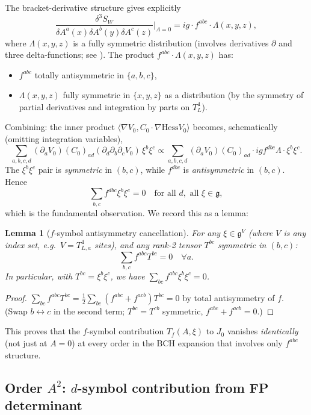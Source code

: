 \documentclass[11pt,a4paper]{amsart}
\newtheorem{lemma}[theorem]{Lemma}
\theoremstyle{definition}
\newcommand{\gfrak}{\mathfrak{g}}
\newcommand{\Hess}{\mathrm{Hess}}
\begin{document}
The bracket-derivative structure gives explicitly
\[
\frac{\delta^3 S_W}{\delta A^a(x) \delta A^b(y) \delta A^c(z)}\Bigr|_{A=0}
= i g \cdot f^{abc} \cdot \Lambda(x, y, z),
\]
where $\Lambda(x, y, z)$ is a fully symmetric distribution (involves
derivatives $\partial$ and three delta-functions; see
\cite[Eq.~(3.6)]{PeskinSchroeder1995}). The product
$f^{abc} \cdot \Lambda(x,y,z)$ has:
\begin{itemize}[leftmargin=2em]
\item $f^{abc}$ totally antisymmetric in $\{a,b,c\}$,
\item $\Lambda(x, y, z)$ fully symmetric in $\{x, y, z\}$ as a distribution
(by the symmetry of partial derivatives and integration by parts on $T^4_L$).
\end{itemize}

Combining: the inner product $\langle \nabla V_0, C_0 \cdot \nabla \Hess V_0\rangle$
becomes, schematically (omitting integration variables),
\[
\sum_{a, b, c, d} (\partial_a V_0) (C_0)_{ad} (\partial_d \partial_b \partial_c V_0) \, \xi^b \xi^c
\propto \sum_{a, b, c, d} (\partial_a V_0) (C_0)_{ad} \cdot i g f^{dbc} \Lambda \cdot \xi^b \xi^c.
\]
The $\xi^b \xi^c$ pair is \emph{symmetric} in $(b,c)$, while $f^{dbc}$
is \emph{antisymmetric} in $(b,c)$. Hence
\[
\sum_{b, c} f^{dbc} \xi^b \xi^c = 0 \quad \text{for all } d, \text{ all } \xi \in \gfrak,
\]
which is the fundamental observation. We record this as a lemma:

\begin{lemma}[$f$-symbol antisymmetry cancellation]\label{lem:fabc-cancel}
For any $\xi \in \gfrak^V$ (where $V$ is any index set, e.g.\ $V = T^4_{L,a}$ sites),
and any rank-2 tensor $T^{bc}$ symmetric in $(b,c)$:
\[
\sum_{b, c} f^{abc} T^{bc} = 0 \quad \forall a.
\]
In particular, with $T^{bc} = \xi^b \xi^c$, we have $\sum_{bc} f^{abc} \xi^b \xi^c = 0$.
\end{lemma}

\begin{proof}
$\sum_{bc} f^{abc} T^{bc} = \frac{1}{2}\sum_{bc}(f^{abc} + f^{acb}) T^{bc} = 0$
by total antisymmetry of $f$. (Swap $b \leftrightarrow c$ in the second term;
$T^{bc} = T^{cb}$ symmetric, $f^{abc} + f^{acb} = 0$.)
\end{proof}

This proves that the $f$-symbol contribution $T_f(A, \xi)$ to $J_0$ vanishes
\emph{identically} (not just at $A = 0$) at every order in the BCH
expansion that involves only $f^{abc}$ structure.

\subsection{Order $A^2$: $d$-symbol contribution from FP determinant}\label{ssec:dsym}
\end{document}
